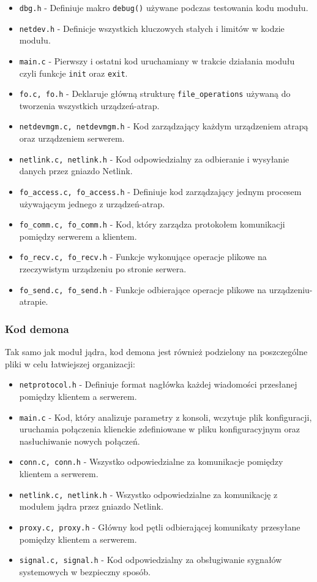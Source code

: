 \documentclass[11pt]{scrartcl}
\begin{document}
\begin{itemize}
\itemsep1pt\parskip0pt
\item
    \texttt{dbg.h} - Definiuje makro \texttt{debug()} używane podczas testowania kodu modułu.
\item
  \texttt{netdev.h} - Definicje wszystkich kluczowych stałych i limitów w kodzie modułu.
\item
  \texttt{main.c} - Pierwszy i ostatni kod uruchamiany w trakcie działania modułu czyli funkcje \texttt{init} oraz \texttt{exit}.
\item
  \texttt{fo.c, fo.h} - Deklaruje główną strukturę
  \texttt{file\_operations} używaną do tworzenia wszystkich urządzeń-atrap.
\item
  \texttt{netdevmgm.c, netdevmgm.h} - Kod zarządzający każdym urządzeniem atrapą oraz urządzeniem serwerem.
\item
  \texttt{netlink.c, netlink.h} - Kod odpowiedzialny za odbieranie i wysyłanie danych przez gniazdo Netlink.
\item
  \texttt{fo\_access.c, fo\_access.h} - Definiuje kod zarządzający jednym procesem używającym jednego z urządzeń-atrap.
\item
  \texttt{fo\_comm.c, fo\_comm.h} - Kod, który zarządza protokołem komunikacji pomiędzy serwerem a klientem.
\item
  \texttt{fo\_recv.c, fo\_recv.h} - Funkcje wykonujące operacje plikowe na rzeczywistym urządzeniu po stronie serwera.
\item
  \texttt{fo\_send.c, fo\_send.h} - Funkcje odbierające operacje plikowe na urządzeniu-atrapie.
\end{itemize}

\subsubsection{Kod demona}

Tak samo jak moduł jądra, kod demona jest również podzielony na poszczególne pliki w celu łatwiejszej organizacji:

\begin{itemize}
\itemsep1pt\parskip0pt
\item
  \texttt{netprotocol.h} - Definiuje format nagłówka każdej wiadomości przesłanej pomiędzy klientem a serwerem.
\item
  \texttt{main.c} - Kod, który analizuje parametry z konsoli, wczytuje plik konfiguracji, uruchamia połączenia klienckie zdefiniowane w pliku konfiguracyjnym oraz nasłuchiwanie nowych połączeń.
\item
  \texttt{conn.c, conn.h} - Wszystko odpowiedzialne za komunikacje pomiędzy klientem a serwerem.
\item
  \texttt{netlink.c, netlink.h} - Wszystko odpowiedzialne za komunikację z modułem jądra przez gniazdo Netlink.
\item
  \texttt{proxy.c, proxy.h} - Główny kod pętli odbierającej komunikaty przesyłane pomiędzy klientem a serwerem.
\item
  \texttt{signal.c, signal.h} - Kod odpowiedzialny za obsługiwanie sygnałów systemowych w bezpieczny sposób.
\end{itemize}
\end{document}
